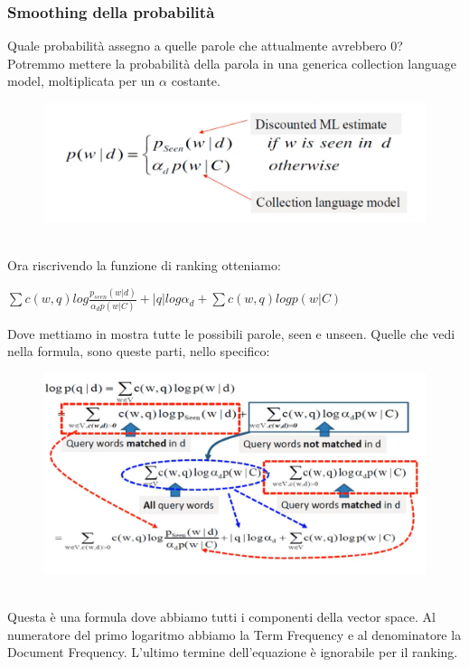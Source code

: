 \subsubsection{Smoothing della probabilità}
Quale probabilità assegno a quelle parole che attualmente avrebbero 0? Potremmo mettere la probabilità della parola in una generica collection language model, moltiplicata per un $\alpha$ costante. 
\\
\begin{figure}[th]
    \centering
    \includegraphics[scale=0.35]{Text Analysis/img/probabo.png}
\end{figure}
\\
Ora riscrivendo la funzione di ranking otteniamo: 
\begin{center}
    \begin{math}
        \sum c(w,q) log \frac{p_{seen}(w|d)}{\alpha_dp(w|C)}+|q|log\alpha_d + \sum c(w,q) logp(w|C)
    \end{math}
\end{center}
Dove mettiamo in mostra tutte le possibili parole, seen e unseen. Quelle che vedi nella formula, sono queste parti, nello specifico:
\\
\begin{figure}[th]
    \centering
    \includegraphics[scale=0.4]{Text Analysis/img/analysis.png}
\end{figure}
\\
Questa è una formula dove abbiamo tutti i componenti della vector space. Al numeratore del primo logaritmo abbiamo la Term Frequency e al denominatore la Document Frequency. L'ultimo termine dell'equazione è ignorabile per il ranking.  

